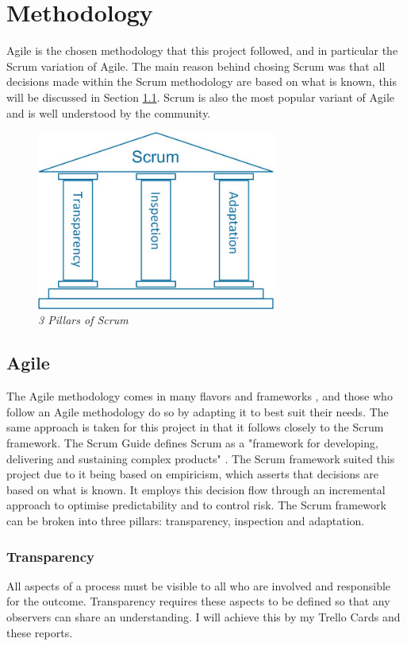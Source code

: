 \section{Methodology}
\label{sub:meth}
Agile is the chosen methodology that this project followed, and in particular the Scrum variation of Agile. The main reason behind chosing Scrum was that all decisions made within the Scrum methodology are based on what is known, this will be discussed in Section \ref{sub:agile}. Scrum is also the most popular variant of Agile \citep{enterprise_2018} and is well understood by the community.

\begin{figure}[!ht]
\centering
\includegraphics*[width=0.7\textwidth]{images/scrum.jpg}
\caption{\em 3 Pillars of Scrum \cite{scrumguide}}
\label{img:scrum-pillar}
\end{figure}

\subsection{Agile}
\label{sub:agile}
The Agile methodology comes in many flavors and frameworks \citep{manifesto}, and those who follow an Agile methodology do so by adapting it to best suit their needs. The same approach is taken for this project in that it follows closely to the Scrum framework. The Scrum Guide defines Scrum as a "framework for developing, delivering and sustaining complex products" \citep{scrum}.
The Scrum framework suited this project due to it being based on empiricism, which asserts that decisions are based on what is known. It employs this decision flow through an incremental approach to optimise predictability and to control risk. The Scrum framework can be broken into three pillars: transparency, inspection and adaptation.

\subsubsection{Transparency}
All aspects of a process must be visible to all who are involved and responsible for the outcome. Transparency requires these aspects to be defined so that any observers can share an understanding. I will achieve this by my Trello Cards and these reports.
